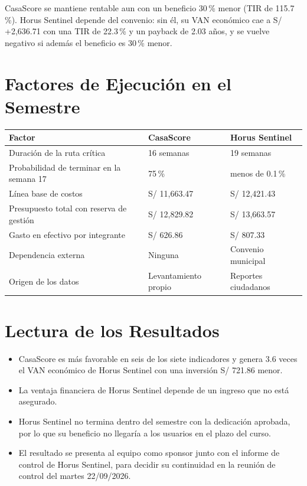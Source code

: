 \documentclass[11pt,a4paper]{article}
\begin{document}
\vspace{0.1cm}
\noindent CasaScore se mantiene rentable aun con un beneficio 30\,\% menor (TIR de 115.7\,\%). Horus Sentinel depende del convenio: sin él, su VAN económico cae a S/ +2,636.71 con una TIR de 22.3\,\% y un payback de 2.03 años, y se vuelve negativo si además el beneficio es 30\,\% menor.

\section{Factores de Ejecución en el Semestre}
{\small
{}
\noindent\begin{tabularx}{\textwidth}{@{}L Q{3.2cm} Q{3.2cm}@{}}
\toprule
{}
\textbf{Factor} & \textbf{CasaScore} & \textbf{Horus Sentinel} \\
\midrule
Duración de la ruta crítica & 16 semanas & 19 semanas \\
Probabilidad de terminar en la semana 17 & 75\,\% & menos de 0.1\,\% \\
Línea base de costos & S/ 11,663.47 & S/ 12,421.43 \\
Presupuesto total con reserva de gestión & S/ 12,829.82 & S/ 13,663.57 \\
Gasto en efectivo por integrante & S/ 626.86 & S/ 807.33 \\
Dependencia externa & Ninguna & Convenio municipal \\
Origen de los datos & Levantamiento propio & Reportes ciudadanos \\
\bottomrule
\end{tabularx}
}

\section{Lectura de los Resultados}
\begin{itemize}[leftmargin=*]
    \item CasaScore es más favorable en seis de los siete indicadores y genera 3.6 veces el VAN económico de Horus Sentinel con una inversión S/ 721.86 menor.
    \item La ventaja financiera de Horus Sentinel depende de un ingreso que no está asegurado.
    \item Horus Sentinel no termina dentro del semestre con la dedicación aprobada, por lo que su beneficio no llegaría a los usuarios en el plazo del curso.
    \item El resultado se presenta al equipo como sponsor junto con el informe de control de Horus Sentinel, para decidir su continuidad en la reunión de control del martes 22/09/2026.
\end{itemize}
\end{document}
